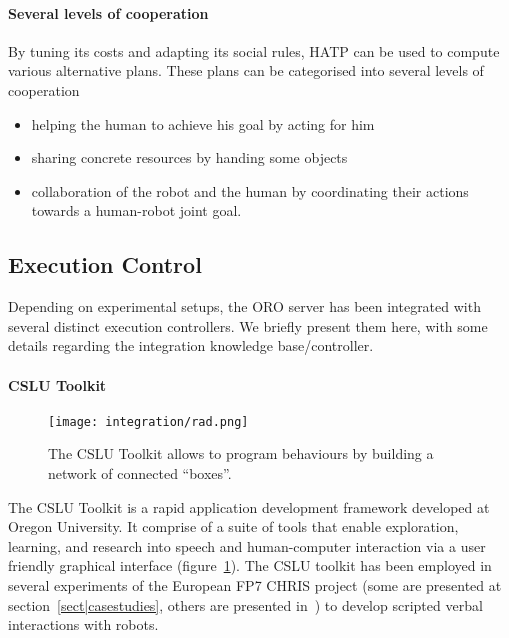 \paragraph{Several levels of cooperation} By tuning its costs and adapting its
social rules, HATP can be used to compute various alternative plans. These
plans can be categorised into several levels of cooperation

\begin{itemize}

    \item helping the human to achieve his goal by acting for him

    \item sharing concrete resources by handing some objects

    \item collaboration of the robot and the human by coordinating their
    actions towards a human-robot joint goal.

\end{itemize}


\subsection{Execution Control}

Depending on experimental setups, the ORO server has been integrated with
several distinct execution controllers. We briefly present them here, with some
details regarding the integration knowledge base/controller.

\paragraph{CSLU Toolkit}
\label{sect|rad}

\begin{figure}
    \centering
    \texttt{[image: integration/rad.png]}

    \caption{The CSLU Toolkit allows to program behaviours by building a
    network of connected ``boxes''.}

    \label{fig|rad}
\end{figure}
The CSLU Toolkit is a rapid application development framework developed at
Oregon University. It comprise of a suite of tools that enable exploration,
learning, and research into speech and human-computer interaction via a user
friendly graphical interface (figure~\ref{fig|rad}). The CSLU toolkit has been
employed in several experiments of the European FP7 CHRIS project (some are
presented at section~\ref{sect|casestudies}, others are presented
in~\cite{Lallee2010, Lallee2011}) to develop scripted verbal interactions with
robots.

